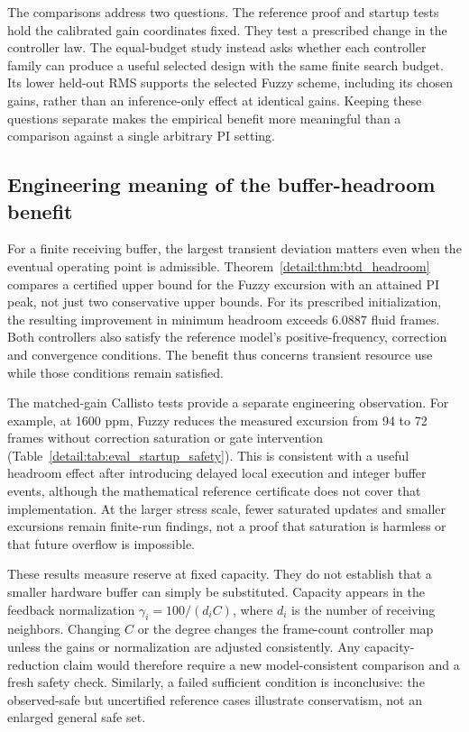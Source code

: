 The comparisons address two questions. The reference proof and
startup tests hold the calibrated gain coordinates fixed. They test
a prescribed change in the controller law. The
equal-budget study instead asks whether each controller family can
produce a useful selected design with the same finite search budget.
Its lower held-out RMS supports the selected Fuzzy scheme, including
its chosen gains, rather than an inference-only effect at identical
gains. Keeping these questions separate makes the empirical benefit
more meaningful than a comparison against a single arbitrary PI setting.

\subsection{Engineering meaning of the buffer-headroom benefit}
\label{detail:subsec:discussion_headroom}

For a finite receiving buffer, the largest transient deviation matters
even when the eventual operating point is admissible.
Theorem~\ref{detail:thm:btd_headroom} compares a certified upper bound for the
Fuzzy excursion with an attained PI peak, not just two conservative
upper bounds. For its prescribed initialization, the resulting
improvement in minimum headroom exceeds 6.0887 fluid frames. Both
controllers also satisfy the reference model's positive-frequency,
correction and convergence conditions. The benefit thus concerns
transient resource use while those conditions remain satisfied.

The matched-gain Callisto tests provide a separate engineering observation.
For example, at 1600 ppm, Fuzzy reduces the measured excursion from
94 to 72 frames without correction saturation or gate intervention
(Table~\ref{detail:tab:eval_startup_safety}). This is consistent with a useful
headroom effect after introducing delayed local execution and integer
buffer events, although the mathematical reference certificate does
not cover that implementation. At the larger stress scale, fewer
saturated updates and smaller excursions remain finite-run findings,
not a proof that saturation is harmless or that future overflow is
impossible.

These results measure reserve at fixed capacity. They do not establish
that a smaller hardware buffer can simply be substituted. Capacity
appears in the feedback normalization
$\gamma_i=100/(d_iC)$, where $d_i$ is the number of receiving neighbors.
Changing $C$ or the degree changes the frame-count controller map
unless the gains or normalization are adjusted consistently. Any
capacity-reduction claim would therefore require a new model-consistent
comparison and a fresh safety check. Similarly, a failed sufficient
condition is inconclusive: the observed-safe but uncertified reference cases
illustrate conservatism, not an enlarged general safe set.


